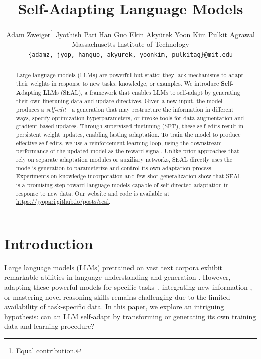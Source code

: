 \documentclass{article}
\title{Self-Adapting Language Models}
\author{
  Adam Zweiger\thanks{Equal contribution.} \quad
  Jyothish Pari\footnotemark[1]\hspace{0.42em}\textsuperscript{\dag} \quad
  Han Guo \quad
  Ekin Akyürek \quad
  Yoon Kim \quad
  Pulkit Agrawal\textsuperscript{\dag} \vspace{1mm} \\
  Massachusetts Institute of Technology \vspace{1mm} \\
  \texttt{\{adamz, jyop, hanguo, akyurek, yoonkim, pulkitag\}@mit.edu}
  \vspace{-2mm}
}
\begin{document}
\maketitle

\begingroup
\renewcommand\thefootnote{\dag} %
\endgroup

\begin{abstract}
Large language models (LLMs) are powerful but static; they lack mechanisms to adapt their weights in response to new tasks, knowledge, or examples. We introduce \textbf{Se}lf-\textbf{A}dapting \textbf{L}LMs (SEAL), a framework that enables LLMs to self-adapt by generating their own finetuning data and update directives. Given a new input, the model produces a \textit{self-edit}---a generation that may restructure the information in different ways, specify optimization hyperparameters, or invoke tools for data augmentation and gradient-based updates. Through supervised finetuning (SFT), these self-edits result in persistent weight updates, enabling lasting adaptation. To train the model to produce effective self-edits, we use a reinforcement learning loop, using the downstream performance of the updated model as the reward signal. Unlike prior approaches that rely on separate adaptation modules or auxiliary networks, SEAL directly uses the model's  generation to parameterize and control its own adaptation process. Experiments on knowledge incorporation and few-shot generalization show that SEAL is a promising step toward language models capable of self-directed adaptation in response to new data. Our website and code is available at \url{https://jyopari.github.io/posts/seal}.
\end{abstract}

\section{Introduction}

Large language models (LLMs) pretrained on vast text corpora exhibit remarkable abilities in language understanding and generation \citep{brown2020language,touvron2023llama,grattafiori2024llama3herdmodels,groeneveld2024olmo,qwen2025qwen25technicalreport}. However, adapting these powerful models for specific tasks~\citep{gururangan2020finetune}, integrating new information \citep{zhu2021modifying}, or mastering novel reasoning skills \citep{chollet2024arc} remains challenging due to the limited availability of task-specific data. In this paper, we explore an intriguing hypothesis: can an LLM self-adapt by transforming or generating its own training data and learning procedure?
\end{document}
